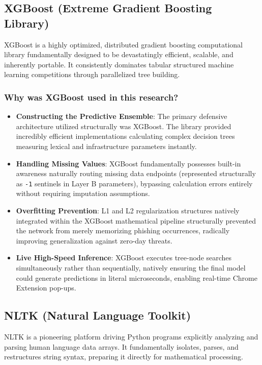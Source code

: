 \subsection{XGBoost (Extreme Gradient Boosting Library)}
\noindent
XGBoost is a highly optimized, distributed gradient boosting computational library fundamentally designed to be devastatingly efficient, scalable, and inherently portable. It consistently dominates tabular structured machine learning competitions through parallelized tree building.

\subsubsection*{Why was XGBoost used in this research?}
\begin{itemize}
\item \textbf{Constructing the Predictive Ensemble}: The primary defensive architecture utilized structurally was XGBoost. The library provided incredibly efficient implementations calculating complex decision trees measuring lexical and infrastructure parameters instantly.
\item \textbf{Handling Missing Values}: XGBoost fundamentally possesses built-in awareness naturally routing missing data endpoints (represented structurally as \texttt{-1} sentinels in Layer B parameters), bypassing calculation errors entirely without requiring imputation assumptions.
\item \textbf{Overfitting Prevention}: L1 and L2 regularization structures natively integrated within the XGBoost mathematical pipeline structurally prevented the network from merely memorizing phishing occurrences, radically improving generalization against zero-day threats.
\item \textbf{Live High-Speed Inference}: XGBoost executes tree-node searches simultaneously rather than sequentially, natively ensuring the final model could generate predictions in literal microseconds, enabling real-time Chrome Extension pop-ups.
\end{itemize}

\subsection{NLTK (Natural Language Toolkit)}
\noindent
NLTK is a pioneering platform driving Python programs explicitly analyzing and parsing human language data arrays. It fundamentally isolates, parses, and restructures string syntax, preparing it directly for mathematical processing.

